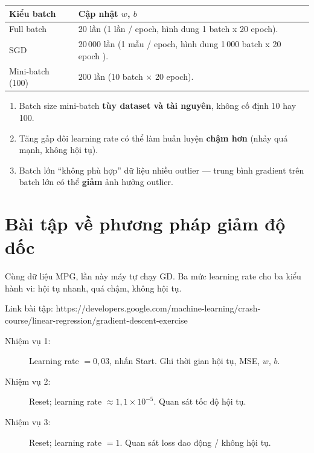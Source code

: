 \documentclass[12pt,a4paper]{article}
\begin{document}
\begin{congthuc}[title={Số lần cập nhật tham số (ví dụ 1000 mẫu, 20 epoch)}]
\begin{tabularx}{\textwidth}{@{}l X@{}}
\textbf{Kiểu batch} & \textbf{Cập nhật $w$, $b$} \\
\midrule
Full batch & 20 lần (1 lần / epoch, hình dung 1 batch x 20 epoch). \\
SGD & 20\,000 lần (1 mẫu / epoch, hình dung 1\,000 batch x 20 epoch ). \\
Mini-batch (100) & 200 lần (10 batch $\times$ 20 epoch). \\
\end{tabularx}
\end{congthuc}

\begin{luuy}
\begin{enumerate}
  \item Batch size mini-batch \textbf{tùy dataset và tài nguyên}, không cố định 10 hay 100.
  \item Tăng gấp đôi learning rate có thể làm huấn luyện \textbf{chậm hơn} (nhảy quá mạnh, không hội tụ).
  \item Batch lớn ``không phù hợp'' dữ liệu nhiều outlier --- trung bình gradient trên batch lớn có thể \textbf{giảm} ảnh hưởng outlier.
\end{enumerate}
\end{luuy}

\newpage

\section{Bài tập về phương pháp giảm độ dốc}

\begin{dongco}[title={Thực hành learning rate}]
Cùng dữ liệu MPG, lần này máy tự chạy GD. Ba mức learning rate cho ba kiểu hành vi: hội tụ nhanh, quá chậm, không hội tụ.

Link bài tập: https://developers.google.com/machine-learning/crash-course/linear-regression/gradient-descent-exercise
\end{dongco}

\begin{phuongphap}[title={Ba nhiệm vụ}]
\begin{description}
  \item[Nhiệm vụ 1:] Learning rate $= 0{,}03$, nhấn Start. Ghi thời gian hội tụ, MSE, $w$, $b$.
  \item[Nhiệm vụ 2:] Reset; learning rate $\approx 1{,}1 \times 10^{-5}$. Quan sát tốc độ hội tụ.
  \item[Nhiệm vụ 3:] Reset; learning rate $= 1$. Quan sát loss dao động / không hội tụ.
\end{description}
\end{phuongphap}
\end{document}
